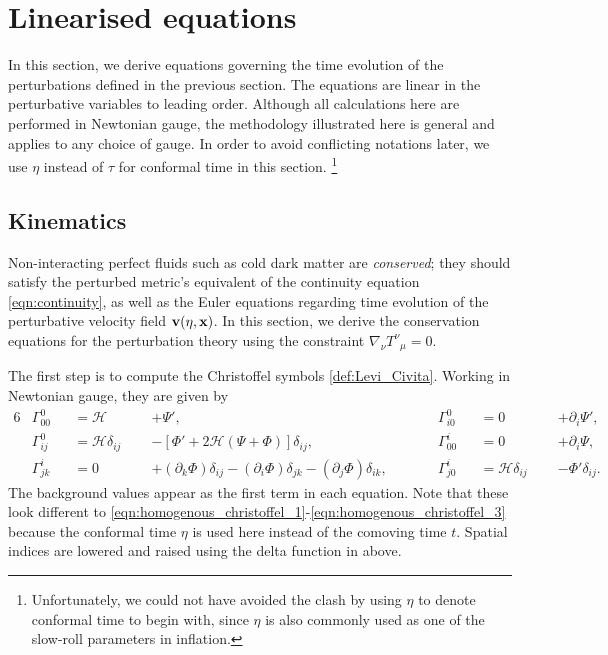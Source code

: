 \section{Linearised equations} \label{section:linearised_equations}

In this section, we derive equations governing the time evolution of the perturbations defined in the previous section. The equations are linear in the perturbative variables to leading order. Although all calculations here are performed in Newtonian gauge, the methodology illustrated here is general and applies to any choice of gauge. In order to avoid conflicting notations later, we use $\eta$ instead of $\tau$ for conformal time in this section. \footnote{Unfortunately, we could not have avoided the clash by using $\eta$ to denote conformal time to begin with, since $\eta$ is also commonly used as one of the slow-roll parameters in inflation.}

\subsection{Kinematics}

Non-interacting perfect fluids such as cold dark matter are \textit{conserved}; they should satisfy the perturbed metric's equivalent of the continuity equation \eqref{eqn:continuity}, as well as the Euler equations regarding time evolution of the perturbative velocity field $\mathbf{v}(\eta,\mathbf{x})$. In this section, we derive the conservation equations for the perturbation theory using the constraint $\nabla_\nu {T^\nu}_\mu = 0$.

The first step is to compute the Christoffel symbols \eqref{def:Levi_Civita}. Working in Newtonian gauge, they are given by
\begin{alignat}{6}
	&\Gamma^{0}_{00} &&= \mathcal{H} \;\;&&+ \Psi', \qquad &&\Gamma^{0}_{i0} &&= 0 \;\;&&+ \partial_i\Psi', \label{eqn:perturbed_christoffel_symbols_1}\\
	&\Gamma^{0}_{ij} &&= \mathcal{H}\delta_{ij} \;\;&&- \left[\Phi' + 2\mathcal{H}(\Psi+\Phi) \right]\delta_{ij}, \qquad &&\Gamma^{i}_{00} &&= 0 \;\;&&+ \partial_i\Psi, \label{eqn:perturbed_christoffel_symbols_2}\\
	&\Gamma^{i}_{jk} &&= 0 \;\;&&+ (\partial_k \Phi)\delta_{ij} - (\partial_i \Phi)\delta_{jk} - (\partial_j \Phi)\delta_{ik}, \qquad &&\Gamma^{i}_{j0} &&= \mathcal{H}\delta_{ij} \;\;&&- \Phi'\delta_{ij}. \label{eqn:perturbed_christoffel_symbols_3}
\end{alignat}
The background values appear as the first term in each equation. Note that these look different to \eqref{eqn:homogenous_christoffel_1}-\eqref{eqn:homogenous_christoffel_3} because the conformal time $\eta$ is used here instead of the comoving time $t$. Spatial indices are lowered and raised using the delta function in above.

